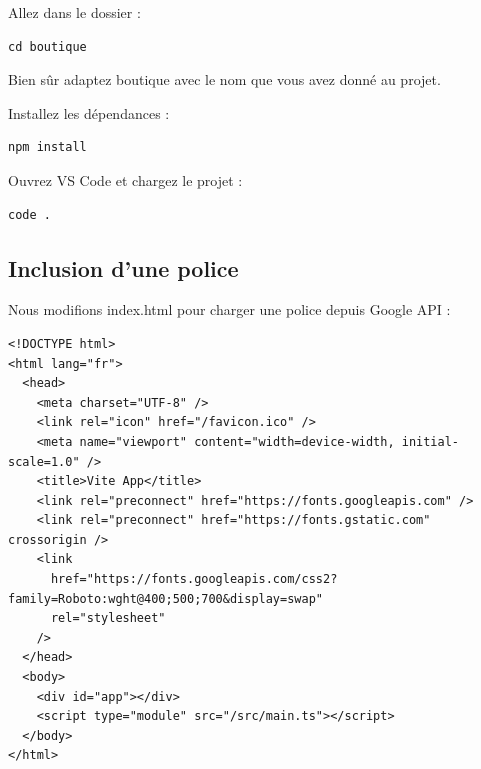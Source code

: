 Allez dans le dossier :
\begin{verbatim}
cd boutique
\end{verbatim}
Bien sûr adaptez {\color{monOrange}boutique} avec le nom que vous avez donné au projet.

Installez les dépendances :
\begin{verbatim}
npm install
\end{verbatim}
Ouvrez {\color{monOrange}VS Code} et chargez le projet :
\begin{verbatim}
code .
\end{verbatim}

\subsection{Inclusion d'une police}
Nous modifions {\color{monOrange}index.html} pour charger une police depuis {\color{monOrange}Google API} :
\begin{verbatim}
<!DOCTYPE html>
<html lang="fr">
  <head>
    <meta charset="UTF-8" />
    <link rel="icon" href="/favicon.ico" />
    <meta name="viewport" content="width=device-width, initial-scale=1.0" />
    <title>Vite App</title>
    <link rel="preconnect" href="https://fonts.googleapis.com" />
    <link rel="preconnect" href="https://fonts.gstatic.com" crossorigin />
    <link
      href="https://fonts.googleapis.com/css2?family=Roboto:wght@400;500;700&display=swap"
      rel="stylesheet"
    />
  </head>
  <body>
    <div id="app"></div>
    <script type="module" src="/src/main.ts"></script>
  </body>
</html>
\end{verbatim}

